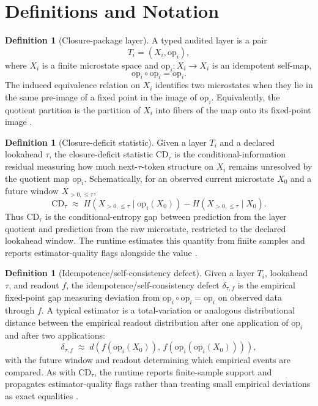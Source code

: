 \documentclass{article}
\newcommand{\Tlayer}[1]{T_{#1}}                    \newcommand{\Xspace}[1]{X_{#1}}                    \newcommand{\opmap}[1]{\mathrm{op}_{#1}}           \newcommand{\CDtau}{\mathrm{CD}_{\tau}}            \newcommand{\IDef}{\delta_{\tau,f}}                \newcommand{\strictcert}{\mathsf{StrictExtCert}}   \newcommand{\Kquot}{K}                             \newcommand{\Rquot}{R}
\theoremstyle{definition}
\newtheorem{definition}[theorem]{Definition}
\begin{document}
\begin{ack}
\end{ack}




\appendix
\section{Definitions and Notation}\label{app:definitions}

\begin{definition}[Closure-package layer]
A typed audited layer is a pair
\[
\Tlayer{i}=(\Xspace{i},\opmap{i}),
\]
where \(\Xspace{i}\) is a finite microstate space and \(\opmap{i}:\Xspace{i}\to\Xspace{i}\) is an idempotent self-map,
\[
\opmap{i}\circ\opmap{i}=\opmap{i}.
\]
The induced equivalence relation on \(\Xspace{i}\) identifies two microstates when they lie in the same pre-image of a fixed point in the image of \(\opmap{i}\). Equivalently, the quotient partition is the partition of \(\Xspace{i}\) into fibers of the map onto its fixed-point image \cite{Tsiokos2026FoundationsI}.
\end{definition}

\begin{definition}[Closure-deficit statistic]
Given a layer \(\Tlayer{i}\) and a declared lookahead \(\tau\), the closure-deficit statistic \(\CDtau\) is the conditional-information residual measuring how much next-\(\tau\)-token structure on \(\Xspace{i}\) remains unresolved by the quotient map \(\opmap{i}\). Schematically, for an observed current microstate \(X_0\) and a future window \(X_{>0,\le \tau}\),
\[
\CDtau
\;\approx\;
H\!\left(X_{>0,\le \tau}\mid \opmap{i}(X_0)\right)
-
H\!\left(X_{>0,\le \tau}\mid X_0\right).
\]
Thus \(\CDtau\) is the conditional-entropy gap between prediction from the layer quotient and prediction from the raw microstate, restricted to the declared lookahead window. The runtime estimates this quantity from finite samples and reports estimator-quality flags alongside the value \cite{Tsiokos2026NoGo}.
\end{definition}

\begin{definition}[Idempotence/self-consistency defect]
Given a layer \(\Tlayer{i}\), lookahead \(\tau\), and readout \(f\), the idempotence/self-consistency defect \(\IDef\) is the empirical fixed-point gap measuring deviation from \(\opmap{i}\circ\opmap{i}=\opmap{i}\) on observed data through \(f\). A typical estimator is a total-variation or analogous distributional distance between the empirical readout distribution after one application of \(\opmap{i}\) and after two applications:
\[
\IDef
\;\approx\;
d\!\left(f(\opmap{i}(X_0)),\, f(\opmap{i}(\opmap{i}(X_0)))\right),
\]
with the future window and readout determining which empirical events are compared. As with \(\CDtau\), the runtime reports finite-sample support and propagates estimator-quality flags rather than treating small empirical deviations as exact equalities \cite{Tsiokos2026FoundationsI}.
\end{definition}
\end{document}
